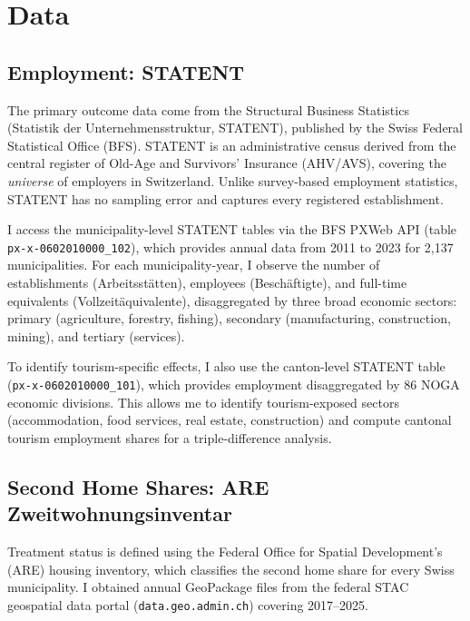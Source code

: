 \documentclass[12pt]{article}
\begin{document}
\section{Data}\label{sec:data}

\subsection{Employment: STATENT}

The primary outcome data come from the Structural Business Statistics (Statistik der Unternehmensstruktur, STATENT), published by the Swiss Federal Statistical Office (BFS). STATENT is an administrative census derived from the central register of Old-Age and Survivors' Insurance (AHV/AVS), covering the \textit{universe} of employers in Switzerland. Unlike survey-based employment statistics, STATENT has no sampling error and captures every registered establishment.

I access the municipality-level STATENT tables via the BFS PXWeb API (table \texttt{px-x-0602010000\_102}), which provides annual data from 2011 to 2023 for 2,137 municipalities. For each municipality-year, I observe the number of establishments (Arbeitsstätten), employees (Beschäftigte), and full-time equivalents (Vollzeitäquivalente), disaggregated by three broad economic sectors: primary (agriculture, forestry, fishing), secondary (manufacturing, construction, mining), and tertiary (services).

To identify tourism-specific effects, I also use the canton-level STATENT table (\texttt{px-x-0602010000\_101}), which provides employment disaggregated by 86 NOGA economic divisions. This allows me to identify tourism-exposed sectors (accommodation, food services, real estate, construction) and compute cantonal tourism employment shares for a triple-difference analysis.

\subsection{Second Home Shares: ARE Zweitwohnungsinventar}

Treatment status is defined using the Federal Office for Spatial Development's (ARE) housing inventory, which classifies the second home share for every Swiss municipality. I obtained annual GeoPackage files from the federal STAC geospatial data portal (\texttt{data.geo.admin.ch}) covering 2017--2025.
\end{document}
